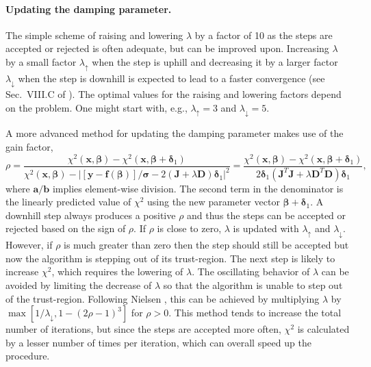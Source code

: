 \documentclass{article}
\begin{document}
\paragraph{Updating the damping parameter.} The simple scheme of raising and lowering $\lambda$ by a factor of 10 as the steps are accepted or rejected is often adequate, but can be improved upon. Increasing $\lambda$ by a small factor $\lambda_\uparrow$ when the step is uphill and decreasing it by a larger factor $\lambda_\downarrow$ when the step is downhill is expected to lead to a faster convergence (see Sec.~VIII.C of \cite{transtrum11}). The optimal values for the raising and lowering factors depend on the problem. One might start with, e.g., $\lambda_\uparrow=3$ and $\lambda_\downarrow=5$.

A more advanced method for updating the damping parameter makes use of the gain factor,
\begin{equation}
  \label{eq:gain_factor}
  \rho = \frac{\chi^2(\bm x, \bm\beta) - \chi^2(\bm x,
    \bm\beta+\bm\delta_1)}{\chi^2(\bm x, \bm\beta) - \left| [\bm y
      - \bm f(\bm\beta)]/\bm\sigma - 2(\bm J+\lambda\bm
      D)\bm\delta_1 \right|^2} = \frac{\chi^2(\bm x, \bm\beta) -
    \chi^2(\bm x, \bm\beta+\bm\delta_1)}{2\bm\delta_1(\bm J^T\bm
    J+\lambda\bm D^T\bm D)\bm\delta_1},
\end{equation}
where $\bm a/\bm b$ implies element-wise division. The second term in the denominator is the linearly predicted value of $\chi^2$ using the new parameter vector $\bm\beta+\bm\delta_1$. A downhill step always produces a positive $\rho$ and thus the steps can be accepted or rejected based on the sign of $\rho$. If $\rho$ is close to zero, $\lambda$ is updated with $\lambda_\uparrow$ and $\lambda_\downarrow$. However, if $\rho$ is much greater than zero then the step should still be accepted but now the algorithm is stepping out of its trust-region. The next step is likely to increase $\chi^2$, which requires the lowering of $\lambda$. The oscillating behavior of $\lambda$ can be avoided by limiting the decrease of $\lambda$ so that the algorithm is unable to step out of the trust-region. Following Nielsen \cite{nielsen99}, this can be achieved by multiplying $\lambda$ by $\max[1/\lambda_\downarrow,1-(2\rho-1)^3]$ for $\rho>0$. This method tends to increase the total number of iterations, but since the steps are accepted more often, $\chi^2$ is calculated by a lesser number of times per iteration, which can overall speed up the procedure.
\end{document}
